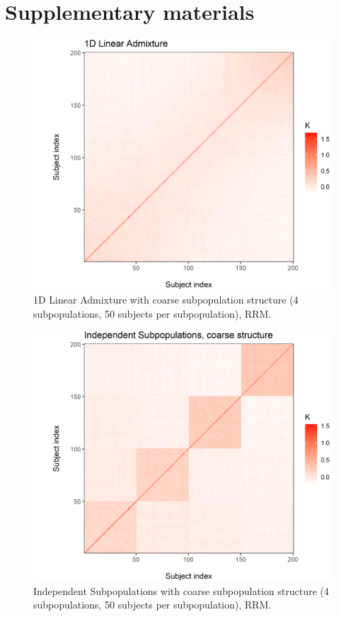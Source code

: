\section{Supplementary materials}

\begin{figure}[H]
    \centering
    \includegraphics[scale = 1]{figures/admixed_kinship.png}
    \caption{1D Linear Admixture with coarse subpopulation structure (4 subpopulations, 50 subjects per subpopulation), RRM.}
    \label{fig:admixed}
\end{figure}

\begin{figure}[H]
    \centering
    \includegraphics[scale = 1]{figures/indep_coarse_kinship.png}
    \caption{Independent Subpopulations with coarse subpopulation structure (4 subpopulations, 50 subjects per subpopulation), RRM.}
    \label{fig:indep_coarse}
\end{figure}

